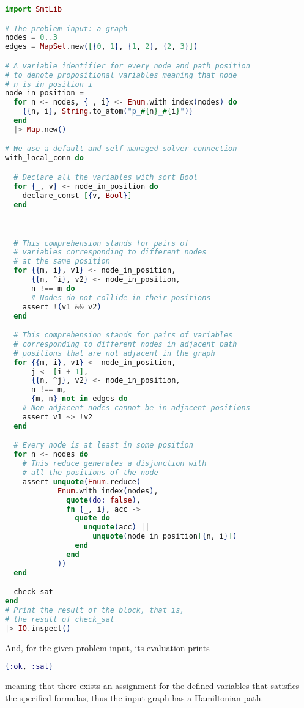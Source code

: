 \begin{lstlisting}[language=elixir,numbers=none,frame=none]
import SmtLib

# The problem input: a graph
nodes = 0..3
edges = MapSet.new([{0, 1}, {1, 2}, {2, 3}])

# A variable identifier for every node and path position
# to denote propositional variables meaning that node 
# n is in position i
node_in_position =
  for n <- nodes, {_, i} <- Enum.with_index(nodes) do
    {{n, i}, String.to_atom("p_#{n}_#{i}")}
  end
  |> Map.new()

# We use a default and self-managed solver connection
with_local_conn do

  # Declare all the variables with sort Bool
  for {_, v} <- node_in_position do
    declare_const [{v, Bool}]
  end

  

  # This comprehension stands for pairs of 
  # variables corresponding to different nodes 
  # at the same position
  for {{m, i}, v1} <- node_in_position, 
      {{n, ^i}, v2} <- node_in_position, 
      n !== m do
      # Nodes do not collide in their positions
    assert !(v1 && v2)
  end

  # This comprehension stands for pairs of variables 
  # corresponding to different nodes in adjacent path 
  # positions that are not adjacent in the graph
  for {{m, i}, v1} <- node_in_position,
      j <- [i + 1],
      {{n, ^j}, v2} <- node_in_position,
      n !== m,
      {m, n} not in edges do
    # Non adjacent nodes cannot be in adjacent positions 
    assert v1 ~> !v2
  end

  # Every node is at least in some position
  for n <- nodes do
    # This reduce generates a disjunction with 
    # all the positions of the node
    assert unquote(Enum.reduce(
            Enum.with_index(nodes),
              quote(do: false),
              fn {_, i}, acc ->
                quote do
                  unquote(acc) ||
                    unquote(node_in_position[{n, i}])
                end
              end
            ))
  end

  check_sat
end
# Print the result of the block, that is,
# the result of check_sat
|> IO.inspect()
\end{lstlisting}

And, for the given problem input, its evaluation prints 

\begin{lstlisting}[language=elixir,numbers=none,frame=none]
{:ok, :sat}
\end{lstlisting}

meaning that there exists an assignment for the defined variables that satisfies
the specified formulas, thus the input graph has a Hamiltonian path.
